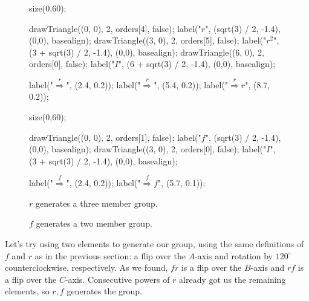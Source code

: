 \documentclass[../gatm.tex]{subfiles}
\begin{document}
\begin{figure}
	\begin{center}
		\begin{minipage}[b]{0.45\textwidth}
			\centering
			\begin{asy}[width=\textwidth]
				size(0,60);
				
				drawTriangle((0, 0), 2, orders[4], false);
				label("$r$", (sqrt(3) / 2, -1.4), (0,0), basealign);
				drawTriangle((3, 0), 2, orders[5], false);
				label("$r^2$", (3 + sqrt(3) / 2, -1.4), (0,0), basealign);
				drawTriangle((6, 0), 2, orders[0], false);
				label("$I$", (6 + sqrt(3) / 2, -1.4), (0,0), basealign);
				
				label("$\stackrel{r}{\Longrightarrow}$", (2.4, 0.2));
				label("$\stackrel{r}{\Longrightarrow}$", (5.4, 0.2));
				label("$\stackrel{r}{\Longrightarrow}r$", (8.7, 0.2));
			\end{asy}
		\end{minipage}
		\hfill
		\begin{minipage}[b]{0.45\textwidth}
			\centering
			\begin{asy}[width=0.7\textwidth]
				size(0,60);
				
				drawTriangle((0, 0), 2, orders[1], false);
				label("$f$", (sqrt(3) / 2, -1.4), (0,0), basealign);
				drawTriangle((3, 0), 2, orders[0], false);
				label("$I$", (3 + sqrt(3) / 2, -1.4), (0,0), basealign);
				
				label("$\stackrel{f}{\Longrightarrow}$", (2.4, 0.2));
				label("$\stackrel{f}{\Longrightarrow}f$", (5.7, 0.1));
			\end{asy}
		\end{minipage}
	\end{center}
	\vspace*{-2\baselineskip}
	\begin{center}
		\begin{minipage}[t]{0.45\textwidth}
			\caption{${r}$ generates a three member group.}
			\label{fig:successive_rotations}
		\end{minipage}
		\hfill
		\begin{minipage}[t]{0.45\textwidth}
			\caption{${f}$ generates a two member group.}
			\label{fig:flips}
		\end{minipage}
	\end{center}
\end{figure}

Let's try using two elements to generate our group, using the same definitions of $f$ and $r$ as in the previous section: a flip over the $A$-axis and rotation by $120^{\circ}$ counterclockwise, respectively. As we found, $fr$ is a flip over the $B$-axis and $rf$ is a flip over the $C$-axis. Consecutive powers of $r$ already got us the remaining elements, so ${r,f}$ generates the group.
\end{document}
